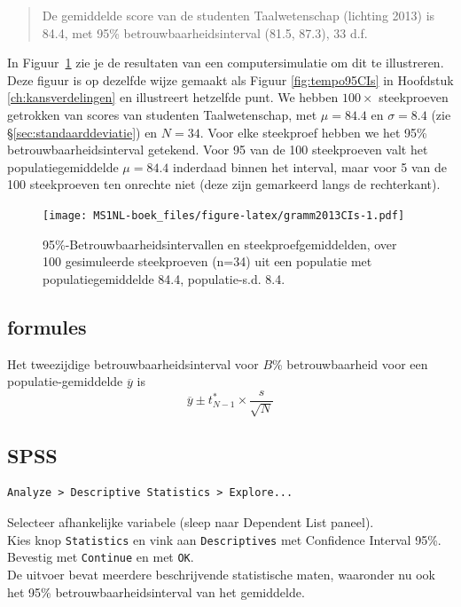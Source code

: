 \documentclass[
]{book}
\begin{document}
\begin{quote}
De gemiddelde score van de studenten Taalwetenschap (lichting 2013) is
84.4, met 95\% betrouwbaarheidsinterval (81.5, 87.3), 33 d.f.
\end{quote}

In Figuur~\ref{fig:gramm2013CIs} zie je de resultaten van een
computersimulatie om dit te illustreren. Deze figuur is op dezelfde wijze gemaakt als Figuur \ref{fig:tempo95CIs} in Hoofdstuk \ref{ch:kansverdelingen} en illustreert hetzelfde punt.
We hebben \(100\times\)
steekproeven getrokken van scores van studenten Taalwetenschap, met
\(\mu=84.4\) en \(\sigma=8.4\) (zie
§\ref{sec:standaarddeviatie}) en \(N=34\). Voor elke steekproef
hebben we het 95\% betrouwbaarheidsinterval getekend. Voor 95 van de 100
steekproeven valt het populatiegemiddelde \(\mu=84.4\) inderdaad binnen
het interval, maar voor 5 van de 100 steekproeven ten onrechte niet
(deze zijn gemarkeerd langs de rechterkant).

\begin{figure}
\centering
\texttt{[image: MS1NL-boek\_files/figure-latex/gramm2013CIs-1.pdf]}
\caption{\label{fig:gramm2013CIs}95\%-Betrouwbaarheidsintervallen en steekproefgemiddelden, over 100 gesimuleerde steekproeven (n=34) uit een populatie met populatiegemiddelde 84.4, populatie-s.d. 8.4.}
\end{figure}

\hypertarget{sec:formules13-2}{%
\subsection{formules}\label{sec:formules13-2}}

Het tweezijdige betrouwbaarheidsinterval voor \(B\)\% betrouwbaarheid voor
een populatie-gemiddelde \(\overline{y}\) is
\begin{equation}
    \overline{y} \pm t^*_{N-1} \times \frac{s}{\sqrt{N}}
  \label{eq:t-onesampleCI}
\end{equation}

\hypertarget{spss-11}{%
\subsection{SPSS}\label{spss-11}}

\begin{verbatim}
Analyze > Descriptive Statistics > Explore...
\end{verbatim}

Selecteer afhankelijke variabele (sleep naar Dependent List paneel).\\
Kies knop \texttt{Statistics} en vink aan \texttt{Descriptives} met Confidence Interval
95\%.\\
Bevestig met \texttt{Continue} en met \texttt{OK}.\\
De uitvoer bevat meerdere beschrijvende statistische maten, waaronder nu
ook het 95\% betrouwbaarheidsinterval van het gemiddelde.
\end{document}
